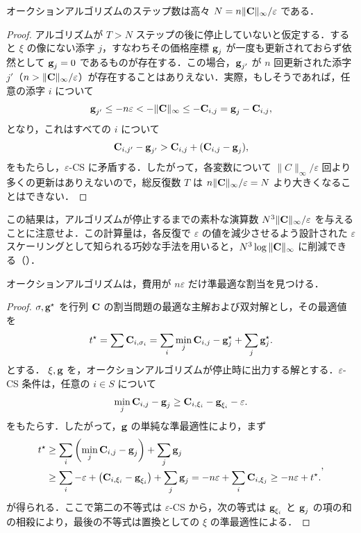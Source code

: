 \begin{prop} オークションアルゴリズムのステップ数は高々 $N=n\|\mathrm{\textbf{C}}\|_\infty/\varepsilon$ である．
\end{prop}
\begin{proof}アルゴリズムが $T>N$ ステップの後に停止していないと仮定する．すると $\xi$ の像にない添字 $j$，すなわちその価格座標 $\mathrm{\textbf{g}}_j$ が一度も更新されておらず依然として $\mathrm{\textbf{g}}_j=0$ であるものが存在する．この場合，$\mathrm{\textbf{g}}_{j'}$ が $n$ 回更新された添字 $j'$（$n>\|\mathrm{\textbf{C}}\|_\infty/\varepsilon$）が存在することはありえない．実際，もしそうであれば，任意の添字 $i$ について
$$\mathrm{\textbf{g}}_{j'}\leq-n\varepsilon<-\|\mathrm{\textbf{C}}\|_\infty\leq -\mathrm{\textbf{C}}_{i,j} = \mathrm{\textbf{g}}_j-\mathrm{\textbf{C}}_{i,j},$$
となり，これはすべての $i$ について
$$\mathrm{\textbf{C}}_{i,j'}-\mathrm{\textbf{g}}_{j'}> \mathrm{\textbf{C}}_{i,j}+ (\mathrm{\textbf{C}}_{i,j}-\mathrm{\textbf{g}}_j),$$
をもたらし，$\varepsilon$-CS に矛盾する．したがって，各変数について $\|C\|_\infty/\varepsilon$ 回より多くの更新はありえないので，総反復数 $T$ は $n\|\mathrm{\textbf{C}}\|_\infty/\varepsilon=N$ より大きくなることはできない．
\end{proof}

\begin{rem} この結果は，アルゴリズムが停止するまでの素朴な演算数 $N^3\|\mathrm{\textbf{C}}\|_\infty/\varepsilon$ を与えることに注意せよ．この計算量は，各反復で $\varepsilon$ の値を減少させるよう設計された $\varepsilon$ スケーリングとして知られる巧妙な手法を用いると，$N^3 \log\|\mathrm{\textbf{C}}\|_\infty$ に削減できる（\cite[p. 264]{bertsekas1998network}）．
\end{rem}

\begin{prop} オークションアルゴリズムは，費用が $n\varepsilon$ だけ準最適な割当を見つける．
\end{prop}
\begin{proof}
	$\sigma,\mathrm{\textbf{g}}^\star$ を行列 $\mathrm{\textbf{C}}$ の割当問題の最適な主解および双対解とし，その最適値を $$t^\star=\sum \mathrm{\textbf{C}}_{i,\sigma_i} = \sum_i \min_{j}\mathrm{\textbf{C}}_{i,j}-\mathrm{\textbf{g}}^\star_j+\sum_j\mathrm{\textbf{g}}^\star_j.$$ とする．
$\xi,\mathrm{\textbf{g}}$ を，オークションアルゴリズムが停止時に出力する解とする．$\varepsilon$-CS 条件は，任意の $i\in S$ について
$$\min_{j} \mathrm{\textbf{C}}_{i,j} - \mathrm{\textbf{g}}_{j}\geq \mathrm{\textbf{C}}_{i,\xi_i} - \mathrm{\textbf{g}}_{\xi_i} -\varepsilon.$$
をもたらす．したがって，$\mathrm{\textbf{g}}$ の単純な準最適性により，まず
	$$\begin{aligned}t^\star&\geq \sum_i \left(\min_{j} \mathrm{\textbf{C}}_{i,j}-\mathrm{\textbf{g}}_{j}\right) + \sum_j \mathrm{\textbf{g}}_j\\
&\geq
	\sum_i -\varepsilon+\left(\mathrm{\textbf{C}}_{i,\xi_i}-\mathrm{\textbf{g}}_{\xi_i}\right) + \sum_j \mathrm{\textbf{g}}_j = -n\varepsilon + \sum_i \mathrm{\textbf{C}}_{i,\xi_j} \geq  - n\varepsilon + t^\star.\end{aligned},$$
が得られる．ここで第二の不等式は $\varepsilon$-CS から，次の等式は $\mathrm{\textbf{g}}_{\xi_i}$ と $\mathrm{\textbf{g}}_{j}$ の項の和の相殺により，最後の不等式は置換としての $\xi$ の準最適性による．
\end{proof}


